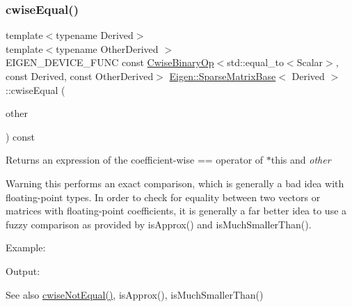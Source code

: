\subsubsection{\texorpdfstring{cwiseEqual()}{cwiseEqual()}\hspace{0.1cm}{\footnotesize\ttfamily [1/2]}}
{\footnotesize\ttfamily template$<$typename Derived$>$ \\
template$<$typename Other\+Derived $>$ \\
E\+I\+G\+E\+N\+\_\+\+D\+E\+V\+I\+C\+E\+\_\+\+F\+U\+NC const \mbox{\hyperlink{class_eigen_1_1_cwise_binary_op}{Cwise\+Binary\+Op}}$<$std\+::equal\+\_\+to$<$Scalar$>$, const Derived, const Other\+Derived$>$ \mbox{\hyperlink{class_eigen_1_1_sparse_matrix_base}{Eigen\+::\+Sparse\+Matrix\+Base}}$<$ Derived $>$\+::cwise\+Equal (\begin{DoxyParamCaption}\item[{const E\+I\+G\+E\+N\+\_\+\+C\+U\+R\+R\+E\+N\+T\+\_\+\+S\+T\+O\+R\+A\+G\+E\+\_\+\+B\+A\+S\+E\+\_\+\+C\+L\+A\+SS$<$ Other\+Derived $>$ \&}]{other }\end{DoxyParamCaption}) const\hspace{0.3cm}{\ttfamily [inline]}}

\begin{DoxyReturn}{Returns}
an expression of the coefficient-\/wise == operator of $\ast$this and {\itshape other} 
\end{DoxyReturn}
\begin{DoxyWarning}{Warning}
this performs an exact comparison, which is generally a bad idea with floating-\/point types. In order to check for equality between two vectors or matrices with floating-\/point coefficients, it is generally a far better idea to use a fuzzy comparison as provided by is\+Approx() and is\+Much\+Smaller\+Than().
\end{DoxyWarning}
Example\+: 
\begin{DoxyCodeInclude}{0}
\end{DoxyCodeInclude}
 Output\+: 
\begin{DoxyVerbInclude}
\end{DoxyVerbInclude}


\begin{DoxySeeAlso}{See also}
\mbox{\hyperlink{class_eigen_1_1_sparse_matrix_base_a343a8ed411a643f1ca3ebd5bc28d0d97}{cwise\+Not\+Equal()}}, is\+Approx(), is\+Much\+Smaller\+Than() 
\end{DoxySeeAlso}
\mbox{\label{class_eigen_1_1_sparse_matrix_base_af1dcaa7c8574dbc2205319a91d798417}} 
